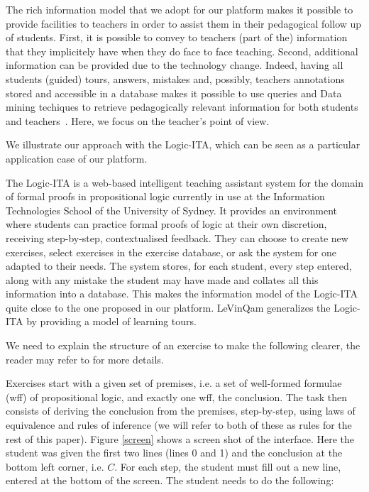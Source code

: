 The rich information model that we adopt for our platform makes it possible to provide facilities to teachers in order to assist them in  their  pedagogical follow up of students. %
First, it is possible to convey to teachers (part of the) information
that they implicitely have when they do face to face teaching. Second,
additional information can be provided due to the technology
change. Indeed, having all students (guided) tours, answers,  mistakes and,
possibly, teachers annotations stored and accessible in a database
makes it possible to use queries and Data mining techiques to retrieve
pedagogically relevant information for both students and
teachers~\cite{amv03}. Here, we focus on the teacher's point of view. 

We illustrate  our approach   with the Logic-ITA, which can be seen as a particular application case of our platform.

The Logic-ITA is a web-based intelligent teaching assistant system for the domain of
formal proofs in propositional logic currently in use at the Information Technologies School of the University of Sydney.
It provides an
environment where students can practice formal proofs of logic at their
own discretion, receiving step-by-step, contextualised feedback. They
can choose to create new exercises, select exercises in the exercise
database, or ask the system for one adapted to their needs. The system
stores, for each student, every step entered, along with
any mistake the student may have made and collates all this
information into a database. This makes the  information model of the
Logic-ITA quite close to the one proposed in our platform. LeVinQam
generalizes the Logic-ITA by providing a model of learning tours. 

We need to explain the structure of an exercise to make  the following
clearer, the reader may refer to \cite{logicT1} for more details. 

Exercises start with a given set of premises, i.e. a set of well-formed formulae (wff) of propositional logic, and exactly one wff, the conclusion. The task then consists of deriving the conclusion from the premises, step-by-step, using laws of equivalence and rules of inference (we will refer to both of these as rules for the rest of this paper). Figure \ref{screen} shows a screen shot of the interface. Here the student was given the first two lines (lines 0 and 1) and the conclusion at the bottom left corner, i.e. $C$. For each step, the student must fill out a new line, entered at the bottom of the screen. The student needs to do the following: 

